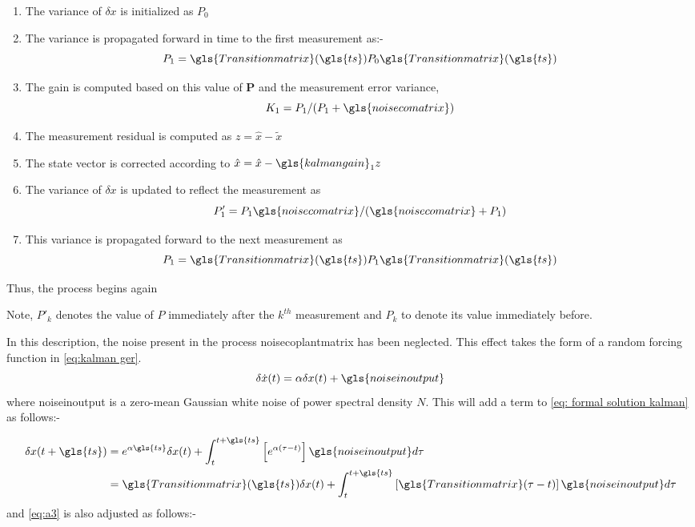 \begin{enumerate}[itemsep=1mm]
	\item The variance of $\delta x$ is initialized as $P_0$
	\item The variance is propagated forward in time to the first measurement as:-
	\[P_1 = \gls{Transitionmatrix}(\gls{ts})P_0\gls{Transitionmatrix}(\gls{ts})\]
	\item The gain is computed based on this value of {\bf P} and the measurement error variance,
	\[K_1=P_1/(P_1 + \gls{noisecomatrix})\]
	\item The measurement residual is computed as $z = \hat{x} - \tilde{x}$
	\item The state vector is corrected according to $\hat{x} = \hat{x} - \gls{kalmangain}_1 z$
	\item The variance of $\delta x$ is updated to reflect the measurement as
	\[P_1'= P_1\gls{noisecomatrix}/(\gls{noisecomatrix}+P_1)\]
	\item This variance is propagated forward to the next measurement as
	\[P_1 = \gls{Transitionmatrix}(\gls{ts})P_1\gls{Transitionmatrix}(\gls{ts})\]
\end{enumerate}
Thus, the process begins again


Note, $P'_k$ denotes the value of $P$ immediately after the $k^{th}$ measurement and $P_k$ to denote its value immediately before.

In this description, the noise present in the process \gls{noisecoplantmatrix} has been neglected. This effect takes the form of a random forcing function in \eqref{eq:kalman ger}.
\begin{equation}
\delta \dot{x}(t) = \alpha\delta x(t) + \gls{noiseinoutput}
\end{equation}
where \gls{noiseinoutput} is a zero-mean Gaussian white noise of power spectral density $N$. This will add a term to \eqref{eq: formal solution kalman} as follows:-


\begin{align}
\begin{split}
\delta x(t+\gls{ts}) &= e^{\alpha\gls{ts}}\delta x(t) + \int_{t}^{t+\gls{ts}}\left[e^{\alpha(\tau-t)}\right]\gls{noiseinoutput}d\tau \\
&= \gls{Transitionmatrix}(\gls{ts}) \delta x(t) + \int_{t}^{t+\gls{ts}}\left[\gls{Transitionmatrix}(\tau - t)\right]\gls{noiseinoutput}d\tau 
\end{split} 
\end{align}
and \eqref{eq:a3} is also adjusted as follows:-


